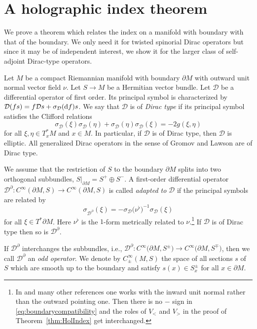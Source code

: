 \documentclass[pdftex]{sigma}
\numberwithin{equation}{section}
\begin{document}
\section{A holographic index theorem}

\label{holographic}

We prove a theorem which relates the index on a manifold with boundary with that of the boundary.
We only need it for twisted spinorial Dirac operators but since it may be of independent interest, we show it for the larger class of self-adjoint Dirac-type operators.

Let $M$ be a compact Riemannian manifold with boundary $\partial M$ with outward unit normal vector field $\nu$.
Let $S \to M$ be a Hermitian vector bundle.
Let $\mathcal{D}$ be a differential operator of first order.
Its principal symbol is characterized by $\mathcal{D}(fs)=f\mathcal{D}s+\sigma_{\mathcal{D}}({\rm d}f)s$.
We say that $\mathcal{D}$ is of \emph{Dirac type} if its principal symbol satisfies the Clifford relations
\[
\sigma_{\mathcal{D}}(\xi)\sigma_{\mathcal{D}}(\eta) + \sigma_{\mathcal{D}}(\eta)\sigma_{\mathcal{D}}(\xi) = -2g(\xi,\eta)
\]
for all $\xi,\eta\in T^*_xM$ and $x\in M$.
In particular, if $\mathcal{D}$ is of Dirac type, then $\mathcal{D}$ is elliptic.
All generalized Dirac operators in the sense of Gromov and Lawson are of Dirac type.

We assume that the restriction of $S$ to the boundary $\partial M$ splits into two orthogonal subbundles, $S|_{\partial M} = S^+\oplus S^-$.
A first-order differential operator $\mathcal{D}^\partial\colon C^\infty(\partial M, S) \to C^\infty(\partial M, S)$ is called \emph{adapted to} $\mathcal{D}$ if the principal symbols are related by
\begin{equation}
\sigma_{\mathcal{D}^\partial}(\xi)=-\sigma_{\mathcal{D}}\big(\nu^\flat\big)^{-1}\sigma_{\mathcal{D}}(\xi)
\label{eq:boundarycompatibility}
\end{equation}
for all $\xi\in T^*\partial M$.
Here $\nu^\flat$ is the $1$-form metrically related to $\nu$.\footnote{In \cite{Baer-Ballmann} and many other references one works with the inward unit normal rather than the outward pointing one. Then there is no $-$ sign in \eqref{eq:boundarycompatibility} and the roles of $V_<$ and $V_>$ in the proof of Theorem~\ref{thm:HolIndex} get interchanged.}
If $\mathcal{D}$ is of Dirac type then so is $\mathcal{D}^\partial$.

If $\mathcal{D}^\partial$ interchanges the subbundles, i.e., $\mathcal{D}^\partial\colon C^\infty\big(\partial M, S^\pm\big) \to C^\infty\big(\partial M, S^\mp\big)$, then we call $\mathcal{D}^\partial$ an \emph{odd operator}.
We denote by $C^\infty_\pm(M,S)$ the space of all sections $s$ of $S$ which are smooth up to the boundary and satisfy $s(x)\in S^\pm_x$ for all $x\in\partial M$.
\end{document}

